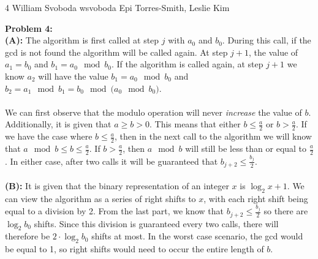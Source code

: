 \documentclass[12pt,letterpaper]{cos340hw}
\begin{document}
           {4}            %
           {William Svoboda}  %
           {wsvoboda}   %
           {Epi Torres-Smith, Leslie Kim} 




\noindent\textbf{Problem 4:}\\
\noindent\textbf{(A):} The algorithm is first called at step $j$ with $a_0$ and $b_0$. During this call, if 
the gcd is not found the algorithm will be called again. At step $j+1$, the value of $a_1 = b_0$ and 
$b_1 = a_0 \mod{b_0}$. If the algorithm is called again, at step $j+1$ we know $a_2$ will have the value 
$b_1 = a_0 \mod{b_0}$ and $b_2 = a_1 \mod{b_1} = b_0 \mod{(a_0 \mod{b_0)}}$.\\\\
We can first observe that the modulo operation will never \emph{increase} the value of $b$. Additionally, 
it is given that $a \ge b > 0$. This means that either $b \le \frac{a}{2}$ or $b > \frac{a}{2}$. If we have 
the case where $b \le \frac{a}{2}$, then in the next call to the algorithm we will know that $a \mod {b} \le b \le \frac{a}{2}$. 
If  $b > \frac{a}{2}$, then $a \mod{b}$ will still be less than or equal to $\frac{a}{2}$. In either case, 
after two calls it will be guaranteed that $b_{j+2} \le \frac{b_j}{2}$.\\\\
\noindent\textbf{(B):} It is given that the binary representation of an integer $x$ is $\log_2x + 1$. We 
can view the algorithm as a series of right shifts to $x$, with each right shift being equal to a division 
by 2. From the last part, we know that $b_{j+2} \le \frac{b_j}{2}$ so there are $\log_2 b_0$ shifts. Since 
this division is guaranteed every two calls, there will therefore be  $2 \cdot \log_2 b_0$ shifts at most. 
In the worst case scenario, the gcd would be equal to 1, so right shifts would need to occur the entire 
length of $b$.


\end{document}
